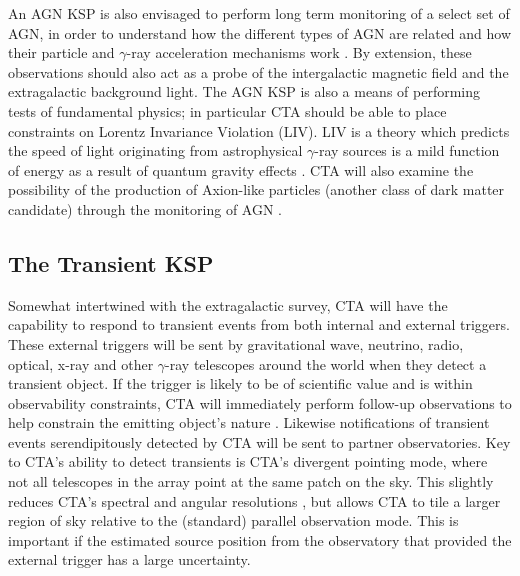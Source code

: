An AGN KSP is also envisaged to perform long term monitoring of a select set of AGN, in order to understand how the different types of AGN are related and how their particle and $\gamma$-ray acceleration mechanisms work \cite{scienceCTA}. By extension, these observations should also act as a probe of the intergalactic magnetic field and the extragalactic background light. The AGN KSP is also a means of performing tests of fundamental physics; in particular CTA should be able to place constraints on Lorentz Invariance Violation (LIV). LIV is a theory which predicts the speed of light originating from astrophysical $\gamma$-ray sources is a mild function of energy as a result of quantum gravity effects \cite{scienceCTA}. CTA will also examine the possibility of the production of Axion-like particles (another class of dark matter candidate) through the monitoring of AGN \cite{scienceCTA}. 

\subsection{The Transient KSP} 
Somewhat intertwined with the extragalactic survey, CTA will have the capability to respond to transient events from both internal and external triggers. These external triggers will be sent by gravitational wave, neutrino, radio, optical, x-ray and other $\gamma$-ray telescopes around the world when they detect a transient object. If the trigger is likely to be of scientific value and is within observability constraints, CTA will immediately perform follow-up observations to help constrain the emitting object's nature \cite{scienceCTA}. Likewise notifications of transient events serendipitously detected by CTA will be sent to partner observatories. Key to CTA's ability to detect transients is CTA's divergent pointing mode, where not all telescopes in the array point at the same patch on the sky. This slightly reduces CTA's spectral and angular resolutions \cite{scienceCTA}, but allows CTA to tile a larger region of sky relative to the (standard) parallel observation mode. This is important if the estimated source position from the observatory that provided the external trigger has a large uncertainty.

